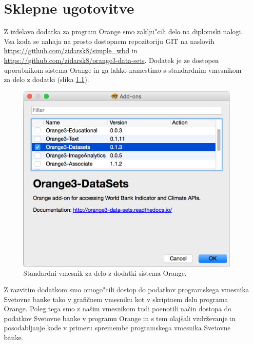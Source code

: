 \chapter{Sklepne ugotovitve}



Z izdelavo dodatka za program Orange smo zaklju"cili delo na diplomski nalogi.
Vsa koda se nahaja na prosto dostopnem repozitoriju GIT na naslovih
\url{https://github.com/zidarsk8/simple_wbd} in
\url{https://github.com/zidarsk8/orange3-data-sets}.
Dodatek je ze dostopen uporabnikom sistema Orange in ga lahko namestimo s
standardnim vmesnikom za delo z dodatki (slika \ref{addon_install}).



\begin{figure}
\begin{center}
\includegraphics[width=12cm]{pic/addon_install.png}
\end{center}
\caption{Standardni vmesnik za delo z dodatki sistema Orange.}
\label{addon_install}
\end{figure} 




Z razvitim dodatkom smo omogo"cili dostop do podatkov programskega vmesnika Svetovne 
banke tako v grafičnem vmesniku kot v skriptnem delu programa Orange. Poleg tega
smo z našim vmesnikom tudi poenotili način dostopa do podatkov Svetovne banke
v programu Orange in s tem olajšali vzdrževanje in posodabljanje kode v
primeru spremembe programskega vmesnika Svetovne banke.



